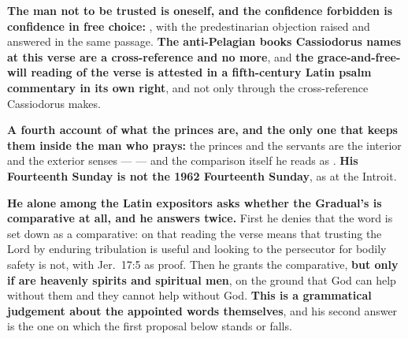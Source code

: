 \begin{witnessnote}
 \textbf{The man not to be trusted is
oneself, and the confidence forbidden is confidence in free choice:}
, with the
predestinarian objection raised and answered in the same passage.
\textbf{The anti-Pelagian books Cassiodorus names at this verse are a
cross-reference and no more}, and \textbf{the grace-and-free-will reading of the verse is
attested in a fifth-century Latin psalm commentary in its own right}, and not
only through the cross-reference Cassiodorus makes.
\end{witnessnote}

\begin{witnessnote}
\textbf{A fourth account of what the princes are, and the only one that keeps
them inside the man who prays:} the princes and the servants are the interior
and the exterior senses ---  --- and the comparison itself he reads as
. \textbf{His Fourteenth Sunday is not the 1962 Fourteenth
Sunday}, as at the Introit.
\end{witnessnote}

\begin{witnessnote}
 \textbf{He alone among
the Latin expositors asks whether the Gradual's  is
comparative at all, and he answers twice.} First he denies that the word is set
down as a comparative: on that reading the verse means that trusting the Lord by
enduring tribulation is useful and looking to the persecutor for bodily safety is
not, with Jer.\ 17:5 as proof. Then he grants the comparative,
\textbf{but only if  are heavenly spirits and spiritual men},
on the ground that God can help without them and they cannot help without God.
\textbf{This is a grammatical judgement about the appointed words themselves},
and his second answer is the one on which the first proposal below stands or
falls.
\end{witnessnote}

